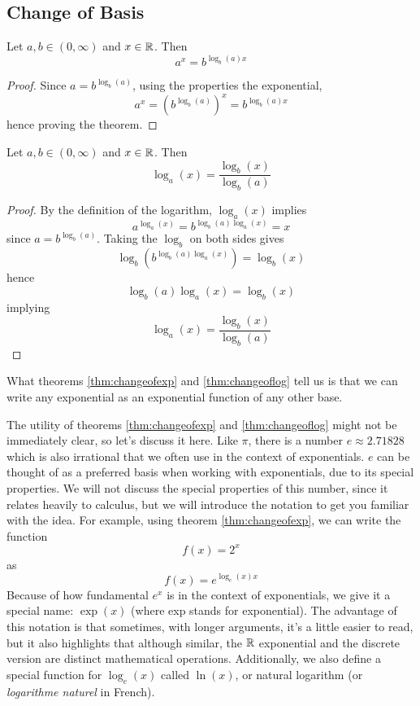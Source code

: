 \subsection{Change of Basis}
\begin{theorem}
Let $a,b\in(0,\infty)$ and $x\in\mathbb{R}$. Then
$$a^x=b^{\log_b(a)x}$$
\label{thm:changeofexp}
\end{theorem}
\begin{proof}
	Since $a=b^{\log_b(a)}$, using the properties the exponential,
	$$a^x=(b^{\log_b(a)})^x=b^{\log_b(a)x}$$
	hence proving the theorem.
\end{proof}

\begin{theorem}
	Let $a,b\in(0,\infty)$ and $x\in\mathbb{R}$. Then
	$$\log_a(x)=\frac{\log_b(x)}{\log_b(a)}$$

	\label{thm:changeoflog}
\end{theorem}
\begin{proof}
	By the definition of the logarithm, $\log_a(x)$ implies
	$$a^{\log_a(x)}=b^{\log_b(a)\log_a(x)}=x$$
	since $a=b^{\log_b(a)}$.
	Taking the $\log_b$ on both sides gives
	$$\log_b(b^{\log_b(a)\log_a(x)})=\log_b(x)$$
	hence
	$$\log_b(a)\log_a(x)=\log_b(x)$$
	implying
	$$\log_a(x)=\frac{\log_b(x)}{\log_b(a)}$$
\end{proof}

What theorems \eqref{thm:changeofexp} and \eqref{thm:changeoflog} tell us is that we can write any exponential as an exponential function of any other base.

The utility of theorems \eqref{thm:changeofexp} and \eqref{thm:changeoflog} might not be immediately clear, so let's discuss it here.
Like $\pi$, there is a number $e\approx 2.71828$ which is also irrational that we often use in the context of exponentials. $e$ can be thought of as a preferred basis when working with exponentials, due to its special properties.
We will not discuss the special properties of this number, since it relates heavily to calculus, but we will introduce the notation to get you familiar with the idea.
For example, using theorem \eqref{thm:changeofexp}, we can write the function
$$f(x)=2^x$$
as
$$f(x)=e^{\log_e(x)x}$$
Because of how fundamental $e^x$ is in the context of exponentials, we give it a special name: $\exp(x)$ (where exp stands for exponential).
The advantage of this notation is that sometimes, with longer arguments, it's a little easier to read, but it also highlights that although similar, the $\mathbb{R}$ exponential and the discrete version are distinct mathematical operations.
Additionally, we also define a special function for $\log_e(x)$ called $\ln(x)$, or natural logarithm (or \textit{logarithme naturel}  in French).

